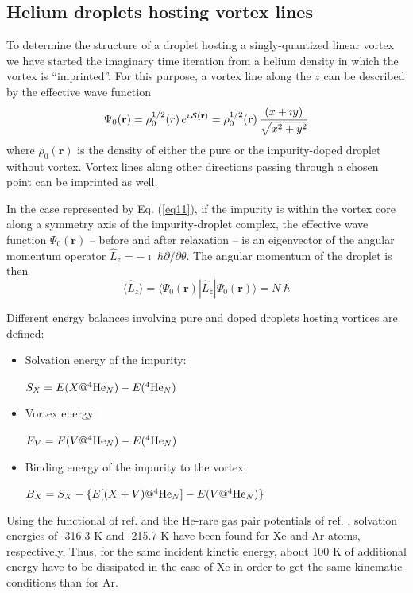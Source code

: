 \subsection{Helium droplets hosting vortex lines}

To determine the structure of a droplet hosting a singly-quantized linear vortex 
we have started the imaginary time iteration from a helium  
density in which the vortex is ``imprinted''. For this purpose, a vortex line
along the $z$  can be described by the effective wave function 
%
\begin{equation}
\Psi_0(\mathbf{r}) =  \rho_0^{1/2}(r) \, e^{\imath  \, {\cal S}(\mathbf{r})} = \rho_0^{1/2}(\mathbf{r}) \, \frac{(x + \imath y)}{\sqrt{x^2 + y^2}} 
\label{eq11}
\end{equation}
%
where $\rho_0(\mathbf{r})$ is the density of 
either the pure or  the impurity-doped droplet without vortex.  
Vortex lines along other directions passing through a chosen point 
can be imprinted as well.\citep{Pi07}
 
In the case represented by Eq. (\ref{eq11}), if the impurity is within the vortex
core along a symmetry axis of the impurity-droplet complex,
the effective wave function $\Psi_0({\mathbf r})$ -- before and after relaxation -- is an eigenvector of the  angular 
momentum operator  $\hat{L}_z = -\imath \; \hbar \partial/\partial \theta$. 
The angular momentum of the droplet is then
\begin{equation}
\langle \hat{L}_z \rangle = \langle \Psi_0(\mathbf{r}) | \hat{L}_z  | \Psi_0(\mathbf{r}) \rangle = N \; \hbar
\label{eq12}
\end{equation}
%

Different energy balances involving pure and doped droplets 
hosting vortices are defined:\citep{Pi07,Anc15,Dal00}
%
\begin{itemize}

\item
Solvation energy of the impurity:

$ S_X = E(X@^4{\rm He}_N) - E(^4{\rm He}_N)$

\item
Vortex  energy:

$E_V= E(V@^4{\rm He}_N) - E(^4{\rm He}_N)$

\item
Binding energy of the impurity to the vortex: 

$B_X = S_X - \{E[(X+V)@^4{\rm He}_N] - E(V@^4{\rm He}_N)\}$

\end{itemize}
%
Using the functional of ref. \citep{Anc05a} and the He-rare gas pair potentials of ref. \citep{Tan86}, solvation energies
of  -316.3 K and -215.7 K have been  found for Xe and Ar atoms, respectively. Thus, for the same incident kinetic
energy, about 100 K of additional energy have to be dissipated in the case of Xe in order to get the same kinematic conditions than for Ar.

